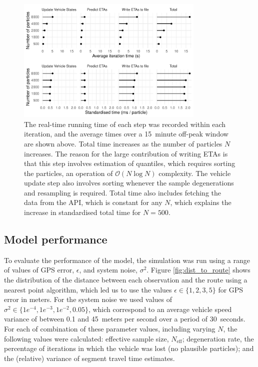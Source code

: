 \begin{figure}[tb]
    \centering
    \includegraphics[width=0.8\textwidth]{figures/04_model_results_timing.pdf}
    \caption{
        The real-time running time of each step was recorded within each iteration,
        and the average times over a 15~minute off-peak window are shown above.
        Total time increases as the number of particles $N$ increases.
        The reason for the large contribution of writing ETAs is that
        this step involves estimation of quantiles,
        which requires sorting the particles, 
        an operation of $\mathcal{O}(N\log N)$ complexity.
        The vehicle update step also involves sorting whenever the sample
        degenerations and resampling is required.
        Total time also includes fetching the data from the API,
        which is constant for any $N$, which explains the increase
        in standardised total time for $N=500$.
    }
    \label{fig:timings}
\end{figure}




\subsection{Model performance}
\label{sec:model_perf}


To evaluate the performance of the model,
the simulation was run using a range of values of GPS error, $\epsilon$,
and system noise, $\sigma^2$.
Figure \ref{fig:dist_to_route} shows the distribution of the distance
between each observation and the route using a nearest point algorithm,
which led us to use the values $\epsilon \in \{1,2,3,5\}$ for GPS error in meters.
For the system noise we used values of $\sigma^2\in \{1e^{-4},1e^{-3},1e^{-2},0.05\}$,
which correspond to an average vehicle speed variance of between 0.1 and 45~meters per second
over a period of 30~seconds.
For each of combination of these parameter values, including varying $N$,
the following values were calculated:
effective sample size, $N_\text{eff}$;
degeneration rate, the percentage of iterations in which the vehicle was lost
(no plausible particles);
and the (relative) variance of segment travel time estimates.


